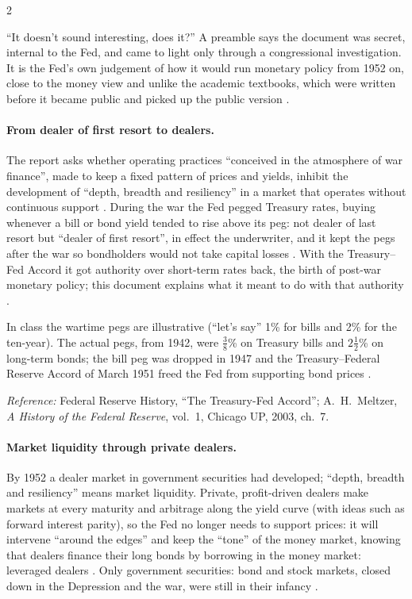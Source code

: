 \begin{paracol}{2}
\begin{reading}
``It doesn't sound interesting, does it?'' A preamble says the document was secret, internal to the Fed, and came to light only through a congressional
investigation. It is the Fed's own judgement of how it would run monetary policy from 1952 on, close to the money view and unlike the academic textbooks,
which were written before it became public and picked up the public version .
\end{reading}

\paragraph{From dealer of first resort to dealers.} The report asks whether operating practices ``conceived in the atmosphere of war finance'', made to keep a
fixed pattern of prices and yields, inhibit the development of ``depth, breadth and resiliency'' in a market that operates without continuous support
. During the war the Fed pegged Treasury rates, buying whenever a bill or bond yield tended to rise above its peg: not dealer of
last resort but ``dealer of first resort'', in effect the underwriter, and it kept the pegs after the war so bondholders would not take capital losses
. With the Treasury--Fed Accord it got authority over short-term rates back, the birth
of post-war monetary policy; this document explains what it meant to do with that authority .

\begin{coursenote}
In class the wartime pegs are illustrative (``let's say'' 1\% for bills and 2\% for the ten-year). The actual pegs, from 1942, were $\tfrac38$\% on Treasury
bills and $2\tfrac12$\% on long-term bonds; the bill peg was dropped in 1947 and the Treasury--Federal Reserve Accord of March 1951 freed the Fed from supporting
bond prices .\par
\emph{Reference:} Federal Reserve History, ``The Treasury-Fed Accord''; A.~H.~Meltzer, \emph{A History of the Federal Reserve}, vol.~1, Chicago UP, 2003, ch.~7.
\end{coursenote}

\paragraph{Market liquidity through private dealers.} By 1952 a dealer market in government securities had developed; ``depth, breadth and resiliency'' means
market liquidity. Private, profit-driven dealers make markets at every maturity and arbitrage along the yield curve (with ideas such as forward interest
parity), so the Fed no longer needs to support prices: it will intervene ``around the edges'' and keep the ``tone'' of the money market, knowing that dealers
finance their long bonds by borrowing in the money market: leveraged dealers .
Only government securities: bond and stock markets, closed down in the Depression and the war, were still in their infancy .


\end{paracol}

